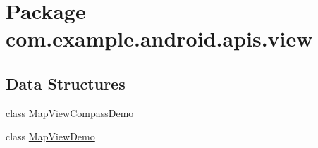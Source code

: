 \hypertarget{namespacecom_1_1example_1_1android_1_1apis_1_1view}{\section{Package com.\-example.\-android.\-apis.\-view}
\label{namespacecom_1_1example_1_1android_1_1apis_1_1view}
}
\subsection*{Data Structures}
\begin{DoxyCompactItemize}
\item 
class \hyperlink{classcom_1_1example_1_1android_1_1apis_1_1view_1_1_map_view_compass_demo}{Map\-View\-Compass\-Demo}
\item 
class \hyperlink{classcom_1_1example_1_1android_1_1apis_1_1view_1_1_map_view_demo}{Map\-View\-Demo}
\end{DoxyCompactItemize}
